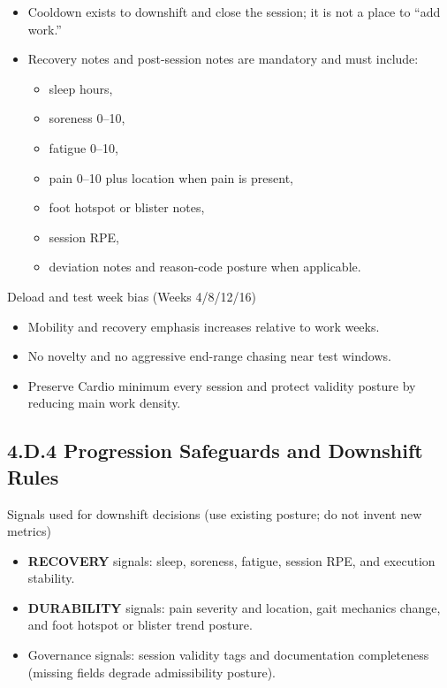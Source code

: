 \documentclass[10pt]{article}
\begin{document}
\begin{itemize}
\item Cooldown exists to downshift and close the session; it is not a place to “add work.”
\item Recovery notes and post-session notes are mandatory and must include:
  \begin{itemize}
  \item sleep hours,
  \item soreness 0–10,
  \item fatigue 0–10,
  \item pain 0–10 plus location when pain is present,
  \item foot hotspot or blister notes,
  \item session RPE,
  \item deviation notes and reason-code posture when applicable.
  \end{itemize}
\end{itemize}

Deload and test week bias (Weeks 4/8/12/16)

\begin{itemize}
\item Mobility and recovery emphasis increases relative to work weeks.
\item No novelty and no aggressive end-range chasing near test windows.
\item Preserve Cardio minimum every session and protect validity posture by reducing main work density.
\end{itemize}

\subsection*{4.D.4 Progression Safeguards and Downshift Rules}
{}

Signals used for downshift decisions (use existing posture; do not invent new metrics)

\begin{itemize}
\item \textbf{RECOVERY} signals: sleep, soreness, fatigue, session RPE, and execution stability.
\item \textbf{DURABILITY} signals: pain severity and location, gait mechanics change, and foot hotspot or blister trend posture.
\item Governance signals: session validity tags and documentation completeness (missing fields degrade admissibility posture).
\end{itemize}
\end{document}

